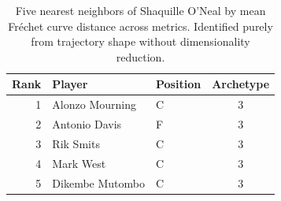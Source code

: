\begin{table}[htbp]
  \centering\small
  \begin{tabular}{rllc}
    \toprule
    Rank & Player & Position & Archetype \\
    \midrule
    1 & Alonzo Mourning & C & 3 \\
    2 & Antonio Davis & F & 3 \\
    3 & Rik Smits & C & 3 \\
    4 & Mark West & C & 3 \\
    5 & Dikembe Mutombo & C & 3 \\
    \bottomrule
  \end{tabular}
  \caption{Five nearest neighbors of Shaquille O'Neal by mean Fr\'{e}chet curve distance across metrics. Identified purely from trajectory shape without dimensionality reduction.}
  \label{tab:Shaquille_O_Neal_frechet_curve_neighbors}
\end{table}

